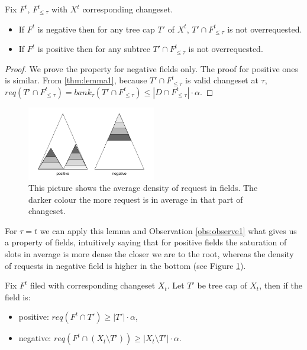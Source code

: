 \begin{lemma}
Fix $F^t$, $F^t_{\leq \tau}$ with $X^t$ corresponding changeset.
\begin{itemize}
 \item If $F^t$ is negative then for any tree cap $T'$ of $X^t$, $T' \cap 
F^t_{\leq \tau}$ is not overrequested.
\item If $F^t$ is positive then for any subtree $T'\cap F^t_{\leq \tau}$ is not 
overrequested.
\end{itemize}
\label{thm:not_over_requested}
\end{lemma}
\begin{proof}
We prove the property for negative fields only. The proof for positive ones is 
similar. From \ref{thm:lemma1}, because $T' \cap  F^t_{\leq \tau}$ is valid 
changeset at $\tau$, $req(T' \cap  F^t_{\leq \tau}) = bank_{\tau}(T' \cap  
F^t_{\leq \tau}) \leq |D \cap F^t_{\leq \tau}| \cdot \alpha$.
\end{proof}
\begin{figure}
\vspace{-20pt}
 \begin{center}
  \includegraphics[width=0.5\textwidth]{density_pic.png}
\end{center}
\caption{This picture shows the average density of request in fields. The 
darker colour the more request is in average in that part of changeset.}
\vspace{-40pt}
\label{fig:density}
\end{figure}
For $\tau = t$ we can apply this lemma and Observation \ref{obs:observe1} 
what gives us a property of fields, intuitively saying that for positive 
fields the saturation of slots in average is more dense the closer we are to 
the root, whereas the density of requests in negative field is higher in the 
bottom (see Figure \ref{fig:density}).
\begin{corollary}
 Fix $F^t$ filed with corresponding changeset $X_t$. Let $T'$ be tree cap of 
$X_t$, then if the field is:
 \begin{itemize}
  \item positive: $req(F^t \cap T') \geq |T'| \cdot \alpha$,
  \item negative: $req(F^t \cap (X_t \setminus T')) \geq |X_t \setminus 
T'| \cdot \alpha$.
 \end{itemize}
 \label{thm:proper_at_t}
\end{corollary}

